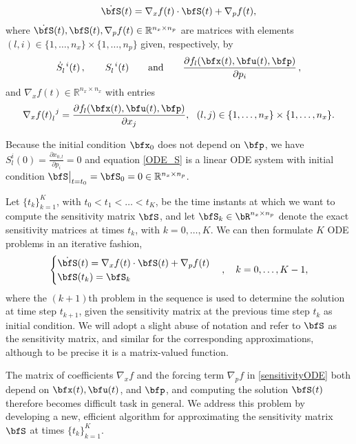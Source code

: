 \documentclass[DIV=12]{scrartcl} %
\theoremstyle{definition}
\begin{document}
\begin{equation}
\label{ODE_S}
    \dot{\bfS}(t) = \nabla_x f(t)\cdot \bfS(t) + \nabla_pf(t),
\end{equation}
where $\dot{\bfS}(t), \bfS(t), \nabla_p f(t)\in\mathbb{R}^{n_x\times n_p}$ are matrices with elements $(l,i)\in\{1,\dots,n_x\}\times\{1,\dots,n_p\}$ given, respectively, by
\[\dot{S}_{l}^{~i}(t)\,,\quad\quad S_{l}^{~i}(t)\quad\quad \text{and}\quad\quad\frac{\partial f_{l}(\bfx(t),\bfu(t),\bfp)}{\partial p_i}\,,\]
and $\nabla_xf(t)\in\mathbb{R}^{n_x\times n_x}$ with entries
\[
\nabla_xf(t)_{l}^{~j}=\frac{\partial f_{l}(\bfx(t),\bfu(t),\bfp)}{\partial x_j}, \ \ (l,j)\in\{1,\dots,n_x\}\times\{1,\dots,n_x\}.
\]

Because the initial condition $\bfx_0$ does not depend on $\bfp$, we have $S_{l}^i(0)=\frac{\partial x_{0,l}}{\partial p_i}=0$ and equation \eqref{ODE_S} is a linear ODE system with initial condition $\bfS\big|_{t=t_0}=\bfS_0=0\in\mathbb{R}^{n_x\times n_p}$.

Let $\{t_k\}_{k=1}^K$, with $t_0 < t_1 < \dots < t_K$, be the time instants at which we want to compute the sensitivity matrix $\bfS$, and let $\bfS_k\in\bR^{n_x\times n_p}$ denote the exact sensitivity matrices at times $t_k$, with $k=0,\dots,K$. We can then formulate $K$ ODE problems in an iterative fashion, 
\begin{equation}
\label{sensitivityODE}
    \begin{cases}
    \dot{\bfS}(t) = \nabla_xf(t)\cdot \bfS(t) + \nabla_pf(t)\\
    \bfS(t_{k})=\bfS_{k}
    \end{cases},\quad k=0,\dots,K-1,
\end{equation}
where the $(k+1)$th problem in the sequence is used to determine the solution at time step $t_{k+1}$, given the sensitivity matrix at the previous time step $t_k$ as initial condition. We will adopt a slight abuse of notation and refer to $\bfS$ as the sensitivity matrix, and similar for the corresponding approximations, although to be precise it is a matrix-valued function. 

The matrix of coefficients $\nabla_xf$ and the forcing term $\nabla_pf$ in \eqref{sensitivityODE} both depend on $\bfx(t), \bfu(t)$, and $\bfp$, and computing the solution $\bfS(t)$ therefore becomes difficult task in general. We address this problem by developing a new, efficient algorithm for approximating the sensitivity matrix $\bfS$ at times $\{t_k\}_{k=1}^K$.
\end{document}
